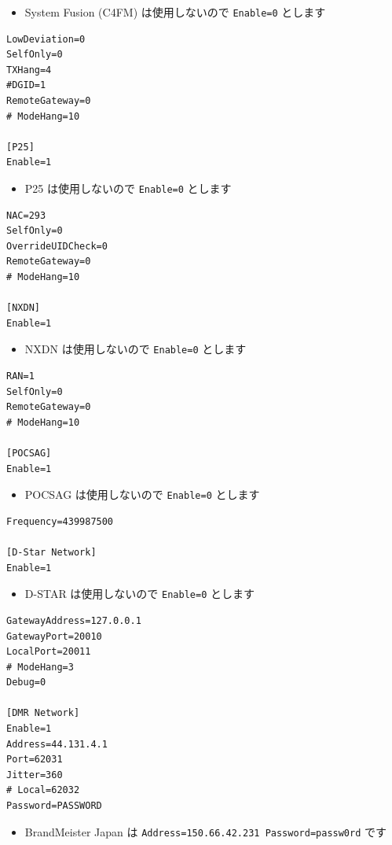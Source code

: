 \documentclass[a4j,oneside]{ujbook}
\begin{document}
\begin{itemize}
 \renewcommand{\labelitemi}{$\triangleright$}
 \item System Fusion (C4FM) は使用しないので \verb+Enable=0+ とします
\end{itemize}
\begin{verbatim}
LowDeviation=0
SelfOnly=0
TXHang=4
#DGID=1
RemoteGateway=0
# ModeHang=10

[P25]
Enable=1
\end{verbatim}
\begin{itemize}
 \renewcommand{\labelitemi}{$\triangleright$}
 \item P25 は使用しないので \verb+Enable=0+ とします
\end{itemize}
\begin{verbatim}
NAC=293
SelfOnly=0
OverrideUIDCheck=0
RemoteGateway=0
# ModeHang=10

[NXDN]
Enable=1
\end{verbatim}
\begin{itemize}
 \renewcommand{\labelitemi}{$\triangleright$}
 \item NXDN は使用しないので \verb+Enable=0+ とします
\end{itemize}
\begin{verbatim}
RAN=1
SelfOnly=0
RemoteGateway=0
# ModeHang=10

[POCSAG]
Enable=1
\end{verbatim}
\begin{itemize}
 \renewcommand{\labelitemi}{$\triangleright$}
 \item POCSAG は使用しないので \verb+Enable=0+ とします
\end{itemize}
\begin{verbatim}
Frequency=439987500

[D-Star Network]
Enable=1
\end{verbatim}
\begin{itemize}
 \renewcommand{\labelitemi}{$\triangleright$}
 \item D-STAR は使用しないので \verb+Enable=0+ とします
\end{itemize}
\begin{verbatim}
GatewayAddress=127.0.0.1
GatewayPort=20010
LocalPort=20011
# ModeHang=3
Debug=0

[DMR Network]
Enable=1
Address=44.131.4.1
Port=62031
Jitter=360
# Local=62032
Password=PASSWORD
\end{verbatim}
\begin{itemize}
 \renewcommand{\labelitemi}{$\triangleright$}
 \item BrandMeister Japan は \verb+Address=150.66.42.231 Password=passw0rd+ です
\end{itemize}
\end{document}
